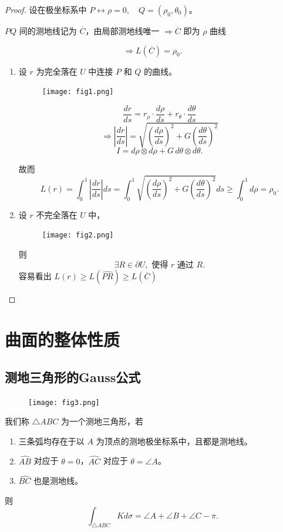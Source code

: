 \documentclass[lang=cn,10pt,thmcnt=section]{elegantbook}
\begin{document}
\begin{proof}
    设在极坐标系中 \( P \leftrightarrow \rho = 0, \quad Q = (\rho_0, \theta_0) \)。

\( PQ \) 间的测地线记为 \( \overline{C} \)，由局部测地线唯一 \(\Rightarrow \overline{C}\) 即为 \( \rho \) 曲线

\[
\Rightarrow L(\overline{C}) = \rho_0.
\]
\begin{enumerate}
    \item 设 \( r \) 为完全落在 \( U \) 中连接 \( P \) 和 \( Q \) 的曲线。
    \begin{figure}[h]
        \centering
        \texttt{[image: fig1.png]} %
    \end{figure}
    \[
    \frac{dr}{ds} = r_{\rho} \cdot \frac{d\rho}{ds} + r_{\theta} \cdot \frac{d\theta}{ds}
    \]
    \[
    \Rightarrow \left| \frac{dr}{ds} \right| = \sqrt{\left( \frac{d\rho}{ds} \right)^2 + G \left( \frac{d\theta}{ds} \right)^2}
    \]
    \[
    I = d\rho \otimes d\rho + G \, d\theta \otimes d\theta.
    \]
    
    故而
    \[
    L(r) = \int_0^1 \left| \frac{dr}{ds} \right| ds = \int_0^1 \sqrt{\left( \frac{d\rho}{ds} \right)^2 + G \left( \frac{d\theta}{ds} \right)^2} ds \geq \int_0^1 d\rho = \rho_0.
    \]
    \item 设 \( r \) 不完全落在 \( U \) 中，
    \begin{figure}[h]
        \centering
        \texttt{[image: fig2.png]} %
    \end{figure}
    
    则
    \[
    \exists R \in \partial U, \text{ 使得 } r \text{ 通过 } R.
    \]
    容易看出 \( L(r) \geq L(\widehat{PR}) \geq L(\overline{C}) \)
\end{enumerate}
\end{proof}

\chapter{曲面的整体性质}
\section{测地三角形的Gauss公式}
\begin{figure}[h]
    \centering
    \texttt{[image: fig3.png]} %
\end{figure}
\begin{theorem}
    我们称 $\triangle ABC$ 为一个测地三角形，若
\begin{enumerate}
    \item 三条弧均存在于以 $A$ 为顶点的测地极坐标系中，且都是测地线。
    \item $\widehat{AB}$ 对应于 $\theta = 0$，$\widehat{AC}$ 对应于 $\theta = \angle A$。
    \item $\widehat{BC}$ 也是测地线。
\end{enumerate}

则
\[
\int_{\triangle ABC} K d\sigma = \angle A + \angle B + \angle C - \pi.
\]
\end{theorem}
\end{document}
